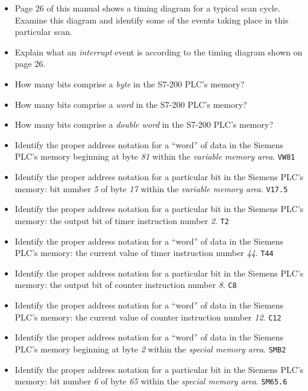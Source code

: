 \begin{itemize}
\item{} Page 26 of this manual shows a timing diagram for a typical scan cycle.  Examine this diagram and identify some of the events taking place in this particular scan.  
\item{} Explain what an {\it interrupt} event is according to the timing diagram shown on page 26.
\item{} How many bits comprise a {\it byte} in the S7-200 PLC's memory?
\item{} How many bits comprise a {\it word} in the S7-200 PLC's memory?
\item{} How many bits comprise a {\it double word} in the S7-200 PLC's memory?
\item{} Identify the proper address notation for a ``word'' of data in the Siemens PLC's memory beginning at byte {\it 81} within the {\it variable memory area}.  {\tt VW81}
\item{} Identify the proper address notation for a particular bit in the Siemens PLC's memory: bit number {\it 5} of byte {\it 17} within the {\it variable memory area}.  {\tt V17.5}
\item{} Identify the proper address notation for a particular bit in the Siemens PLC's memory: the output bit of timer instruction number {\it 2}.  {\tt T2}
\item{} Identify the proper address notation for a ``word'' of data in the Siemens PLC's memory: the current value of timer instruction number {\it 44}.  {\tt T44}
\item{} Identify the proper address notation for a particular bit in the Siemens PLC's memory: the output bit of counter instruction number {\it 8}.  {\tt C8}
\item{} Identify the proper address notation for a ``word'' of data in the Siemens PLC's memory: the current value of counter instruction number {\it 12}.  {\tt C12}
\item{} Identify the proper address notation for a ``word'' of data in the Siemens PLC's memory beginning at byte {\it 2} within the {\it special memory area}.  {\tt SMB2}
\item{} Identify the proper address notation for a particular bit in the Siemens PLC's memory: bit number {\it 6} of byte {\it 65} within the {\it special memory area}.  {\tt SM65.6}
\end{itemize}




